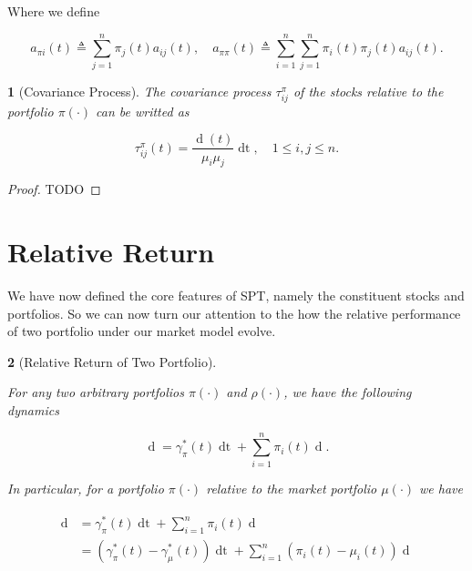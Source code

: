 \documentclass[british]{amsart} \usepackage{lmodern}
\numberwithin{equation}{section} \numberwithin{figure}{section}
\theoremstyle{plain} \newtheorem{thm}{\protect\theoremname}[section]
\theoremstyle{definition} \newtheorem{defn}[thm]{\protect\definitionname}
\theoremstyle{plain} \newtheorem{assumption}[thm]{\protect\assumptionname}
\theoremstyle{plain} \newtheorem{lem}[thm]{\protect\lemmaname}
\theoremstyle{plain} \newtheorem{prop}[thm]{\protect\propositionname}
\theoremstyle{remark} \newtheorem{rem}[thm]{\protect\remarkname}
\theoremstyle{plain} \newtheorem{cor}[thm]{\protect\corollaryname}
\renewcommand{\d}[1]{\mathop{\mathrm{d}{#1}}}
\newcommand{\defeq}{\mathop{\triangleq}} \newcommand{\almostsurely}{\text{a.s.}}
\begin{document}
Where we define

  \begin{equation}
      a_{\pi i}(t) \defeq \sum_{j=1}^{n} \pi_{j}(t)a_{ij}(t), \quad 
      a_{\pi \pi}(t) \defeq \sum_{i=1}^{n} \sum_{j=1}^{n} \pi_{i}(t) \pi_{j}(t) a_{ij}(t).
  \end{equation}


\begin{lem} [Covariance Process]

The covariance process $\tau_{ij}^{\pi}$ of the stocks relative to the portfolio $\pi(\cdot)$ 
can be writted as

\begin{equation}
  \label{eq:tau}
  \tau_{ij}^{\pi}(t) = 
    \frac{ \d{\langle \mu_{i}, \mu_{j} \rangle}(t)}{ \mu_{i} \mu_{j}}\d{t},
    \quad 1 \le i,j \le n.
\end{equation}

\end{lem}

\begin{proof}
TODO
\end{proof}

\newpage
\section{Relative Return}

We have now defined the core features of SPT, namely the constituent stocks and
portfolios. So we can now turn our attention to the how the relative performance of
two portfolio under our market model evolve.

\begin{lem} [Relative Return of Two Portfolio]
  \label{lem:relativereturnoftwoportfolios}

  For any two arbitrary portfolios $\pi(\cdot)$ and $\rho(\cdot)$, we have the
  following dynamics

  \begin{equation}    
    \label{eq:rrdynamics} 
      \d{\log{ \left( \frac{ V^{\pi}(t) }{V^{\rho}(t) } \right) } } = 
        \gamma_{\pi}^{*}(t)\d{t} + 
         \sum_{i=1}^{n} \pi_{i}(t) 
            \d{\log{ \left( \frac{ X_{i}(t) }{ V^{\rho}(t)} \right) }}. 
  \end{equation}

  In particular, for a portfolio $\pi(\cdot)$ relative to the market portfolio
  $\mu(\cdot)$ we have

  \begin{gather} 
    \label{eq:rrdynamics2} 
    \begin{split} 
      \d{ \log{ \left( \frac{V^{\pi}(t) }{ V^{\mu}(t) } \right) } } 
      &= \gamma_{\pi}^{*}(t)\d{t} + 
            \sum_{i=1}^{n} \pi_{i}(t)  \d{ \log{\mu_{i}(t)} } \\ 
      &= (\gamma_{\pi}^{*}(t) - \gamma_{\mu}^{*}(t)) \d{t} +
            \sum_{i=1}^{n} (\pi_{i}(t) - \mu_{i}(t)) \d{\log{\mu_{i}(t)} } \\ 
    \end{split} 
  \end{gather}

\end{lem}
\end{document}
